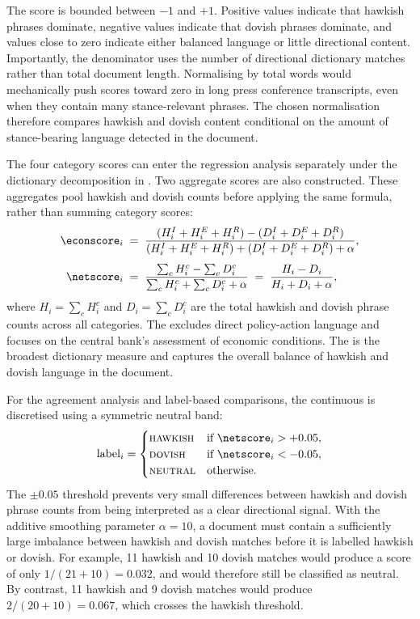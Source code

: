 The score is bounded between $-1$ and $+1$. Positive values indicate
that hawkish phrases dominate, negative values indicate that dovish
phrases dominate, and values close to zero indicate either balanced
language or little directional content. Importantly, the denominator
uses the number of directional dictionary matches rather than total
document length. Normalising by total words would mechanically push
scores toward zero in long press conference transcripts, even when
they contain many stance-relevant phrases. The chosen normalisation
therefore compares hawkish and dovish content conditional on the
amount of stance-bearing language detected in the document.

The four category scores can enter the regression analysis separately
under the dictionary decomposition in
. Two aggregate scores are also
constructed. These aggregates pool hawkish and dovish counts before
applying the same formula, rather than summing category scores:
%
\begin{align}
\econscore_i &\;=\;
   \frac{(H^I_i + H^E_i + H^R_i) - (D^I_i + D^E_i + D^R_i)}
        {(H^I_i + H^E_i + H^R_i) + (D^I_i + D^E_i + D^R_i) + \alpha},
   \label{eq:econscore}\\[4pt]
\netscore_i &\;=\;
   \frac{\sum_c H^c_i - \sum_c D^c_i}
        {\sum_c H^c_i + \sum_c D^c_i + \alpha}
   \;=\; \frac{H_i - D_i}{H_i + D_i + \alpha},
   \label{eq:netscore}
\end{align}
%
where $H_i = \sum_c H^c_i$ and $D_i = \sum_c D^c_i$ are the total
hawkish and dovish phrase counts across all categories. The
\econscore{} excludes direct policy-action language and focuses on
the central bank's assessment of economic conditions. The
\netscore{} is the broadest dictionary measure and captures the
overall balance of hawkish and dovish language in the document.

For the agreement analysis and label-based comparisons, the
continuous \netscore{} is discretised using a symmetric neutral
band:
%
\begin{equation}
\label{eq:classification}
\text{label}_i =
\begin{cases}
\text{\textsc{hawkish}} & \text{if } \netscore_i > +0.05, \\
\text{\textsc{dovish}}  & \text{if } \netscore_i < -0.05, \\
\text{\textsc{neutral}} & \text{otherwise}.
\end{cases}
\end{equation}
%
The $\pm 0.05$ threshold prevents very small differences between
hawkish and dovish phrase counts from being interpreted as a clear
directional signal. With the additive smoothing parameter
$\alpha=10$, a document must contain a sufficiently large imbalance
between hawkish and dovish matches before it is labelled hawkish or
dovish. For example, 11 hawkish and 10 dovish matches would produce
a score of only \(1/(21+10)=0.032\), and would therefore still be
classified as neutral. By contrast, 11 hawkish and 9 dovish matches
would produce \(2/(20+10)=0.067\), which crosses the hawkish
threshold.

